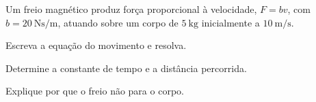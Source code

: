 \begin{questao}[3]{}

Um freio magnético produz força proporcional à velocidade, $F=bv$, com
$b=\SI{20}{\newton\second\per\meter}$, atuando sobre um corpo de
$\SI{5}{\kilogram}$ inicialmente a $\SI{10}{\meter\per\second}$.
\begin{itensq}
\item Escreva a equação do movimento e resolva.
\item Determine a constante de tempo e a distância percorrida.
\item Explique por que o freio não para o corpo.
\end{itensq}


\end{questao}

